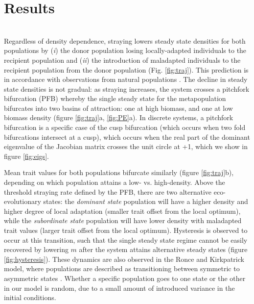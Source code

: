 \documentclass{revtex4}
\begin{document}
\section{Results}


 \\
\noindent Regardless of density dependence, straying lowers steady state densities for both populations by (\emph{i}) the donor population losing locally-adapted individuals to the recipient population and (\emph{ii}) the introduction of maladapted individuals to the recipient population from the donor population (Fig. \ref{fig:traj}).
This prediction is in accordance with observations from natural populations \citep{Bett:2017ha}. %
The decline in steady state densities is not gradual: as straying increases, the system crosses a pitchfork bifurcation (PFB) \citep{AleksandrovichKuznetsov:1995p2580} whereby the single steady state for the metapopulation bifurcates into two basins of attraction: one at high biomass, and one at low biomass density (figure \ref{fig:traj}a, \ref{fig:PE}a).
In discrete systems, a pitchfork bifurcation is a specific case of the cusp bifurcation (which occurs when two fold bifurcations intersect at a cusp), which occurs when the real part of the dominant eigenvalue of the Jacobian matrix crosses the unit circle at +1, which we show in figure \ref{fig:eigs}.

Mean trait values for both populations bifurcate similarly (figure \ref{fig:traj}b), depending on which population attains a low- vs. high-density. 
Above the threshold straying rate defined by the PFB, there are two alternative eco-evolutionary states: the \emph{dominant state} population will have a higher density and higher degree of local adaptation (smaller trait offset from the local optimum), while the \emph{subordinate state} population will have lower density with maladapted trait values (larger trait offset from the local optimum). 
Hysteresis is observed to occur at this transition, such that the single steady state regime cannot be easily recovered by lowering $m$ after the system attains alternative steady states (figure \ref{fig:hysteresis}).
These dynamics are also observed in the Ronce and Kirkpatrick model, where populations are described as transitioning between symmetric to asymmetric states \citep{Ronce:2001dp}.
Whether a specific population goes to one state or the other in our model is random, due to a small amount of introduced variance in the initial conditions.
\end{document}
